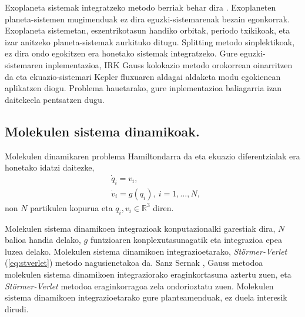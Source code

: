 Exoplaneta sistemak integratzeko metodo berriak behar dira \cite{Fabrycky2010}. Exoplaneten planeta-sistemen mugimenduak ez dira eguzki-sistemarenak bezain egonkorrak. Exoplaneta sistemetan, eszentrikotasun handiko orbitak, periodo txikikoak, eta izar anitzeko planeta-sistemak aurkituko ditugu. Splitting metodo sinplektikoak, ez dira ondo egokitzen era honetako sistemak integratzeko. Gure eguzki-sistemaren inplementazioa, IRK Gauss kolokazio metodo orokorrean oinarritzen da eta ekuazio-sistemari Kepler fluxuaren aldagai aldaketa modu egokienean aplikatzen diogu. Problema hauetarako, gure inplementazioa baliagarria izan daitekeela pentsatzen dugu.         
 

\subsection*{Molekulen sistema dinamikoak.}

Molekulen dinamikaren problema Hamiltondarra da eta ekuazio diferentzialak era honetako idatzi daitezke,
\begin{align*}
&\dot{q}_i=v_i, \\
&\dot{v}_i=g(q_i), \ i=1,\dots,N,
\end{align*}
non $N$ partikulen kopurua eta $q_i,v_i \in \mathbb{R}^3$ diren.

Molekulen sistema dinamikoen integrazioak konputazionalki garestiak dira, $N$ balioa handia delako, $g$ funtzioaren konplexutasunagatik eta integrazioa epea luzea delako. Molekulen sistema dinamikoen integrazioetarako, \emph{Störmer-Verlet} (\ref{eq:stverlet}) metodo nagusienetakoa da. Sanz Sernak \cite{sserna1996}, Gauss metodoa molekulen sistema dinamikoen integraziorako eraginkortasuna aztertu zuen, eta \emph{Störmer-Verlet} metodoa eraginkorragoa zela ondorioztatu zuen.
Molekulen sistema dinamikoen integrazioetarako gure planteamenduak, ez duela interesik dirudi. 

